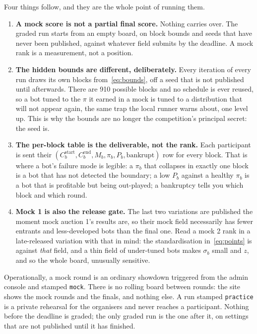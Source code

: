 \documentclass[11pt,a4paper]{article}
\newcommand{\code}[1]{\texttt{\small #1}}
\begin{document}
\noindent
Four things follow, and they are the whole point of running them.

\begin{enumerate}[leftmargin=1.4em]
\item \textbf{A mock score is not a partial final score.} Nothing carries over.
  The graded run starts from an empty board, on block bounds and seeds that have
  never been published, against whatever field submits by the deadline. A mock
  rank is a measurement, not a position.

\item \textbf{The hidden bounds are different, deliberately.} Every iteration of
  every run draws its own blocks from~\eqref{eq:bounds}, off a seed that is not
  published until afterwards. There are 910 possible blocks and no schedule is
  ever reused, so a bot tuned to the $\pi$ it earned in a mock is tuned to a
  distribution that will not appear again, the same trap the local runner
  warns about, one level up. This is why the bounds are no longer the
  competition's principal secret: the seed is.

\item \textbf{The per-block table is the deliverable, not the rank.} Each
  participant is sent their $(C^{\text{start}}_{b}, C^{\text{end}}_{b}, M_b,
  \pi_b, P_b, \text{bankrupt})$ row for every block. That is where a bot's
  failure mode is legible: a $\pi_b$ that collapses in exactly one block is a
  bot that has not detected the boundary; a low $P_b$ against a healthy $\pi_b$
  is a bot that is profitable but being out-played; a bankruptcy tells you which
  block and which round.

\item \textbf{Mock 1 is also the release gate.} The last two variations are
  published the moment mock auction 1's results are, so their mock field
  necessarily has fewer entrants and less-developed bots than the final one.
  Read a mock 2 rank in a late-released variation with that in mind: the
  standardisation in~\eqref{eq:points} is against \emph{that} field, and a thin
  field of under-tuned bots makes $\sigma_b$ small and $z$, and so the whole
  board, unusually sensitive.
\end{enumerate}

\noindent
Operationally, a mock round is an ordinary showdown triggered from the admin
console and stamped \code{mock}. There is no rolling board between rounds: the
site shows the mock rounds and the finals, and nothing else. A run stamped
\code{practice} is a private rehearsal for the organisers and never reaches a
participant. Nothing before the deadline is graded; the only graded run is the
one after it, on settings that are not published until it has finished.
\end{document}
